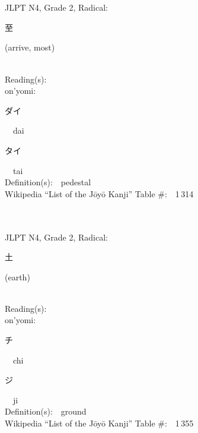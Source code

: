\begin{multicols}{2}
\ \ \\
{\fontsize{34pt}{40pt}  }\ \ \\  %
{JLPT N4, Grade 2, Radical:\ \ {\begin{CJK}{UTF8}{min} 至 \end{CJK}} (arrive, most) } \\
Reading(s):\ \ \\
{\hspace*{1em}}on'yomi:\ \ \\
{\hspace*{2em}}{\begin{CJK}{UTF8}{min} ダイ \end{CJK}}\ \ dai\ \ \\
{\hspace*{2em}}{\begin{CJK}{UTF8}{min} タイ \end{CJK}}\ \ tai\ \ \\
Definition(s):\ \ pedestal \\
Wikipedia ``List of the J\=oy\=o Kanji'' Table \#:\ \ 1\,314 \\
\ \ \\
{\fontsize{34pt}{40pt}  }\ \ \\  %
{JLPT N4, Grade 2, Radical:\ \ {\begin{CJK}{UTF8}{min} 土 \end{CJK}} (earth) } \\
Reading(s):\ \ \\
{\hspace*{1em}}on'yomi:\ \ \\
{\hspace*{2em}}{\begin{CJK}{UTF8}{min} チ \end{CJK}}\ \ chi\ \ \\
{\hspace*{2em}}{\begin{CJK}{UTF8}{min} ジ \end{CJK}}\ \ ji\ \ \\
Definition(s):\ \ ground \\
Wikipedia ``List of the J\=oy\=o Kanji'' Table \#:\ \ 1\,355 \\

\end{multicols}
